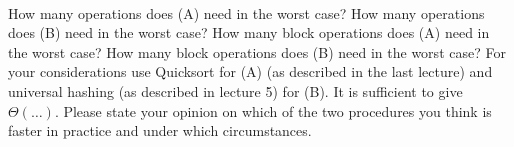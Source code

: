  \\
How many operations does (A) need in the worst case?
How many operations does (B) need in the worst case?
How many block operations does (A) need in the worst case?
How many block operations does (B) need in the worst case?
For your considerations use Quicksort for (A)
(as described in the last lecture) and universal hashing
(as described in lecture 5) for (B).
It is sufficient to give $\Theta (\dots)$.
Please state your opinion on which of the two procedures you think is faster in
practice and under which circumstances.
